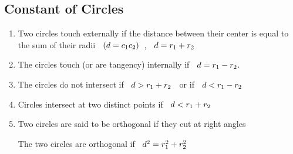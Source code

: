 \documentclass[11pt,a4paper]{article}
\begin{document}
\subsection{Constant of Circles}
\begin{enumerate}
\item Two circles touch externally if the distance between their center is equal to the sum of their radii $\hspace{0.2cm}(d = c_1c_2)\hspace{0.2cm}$, $\hspace{0.2cm} d = r_1 + r_2$

\item The circles touch (or are tangency) internally if $\hspace{0.2cm} d = r_1 - r_2$.

\item The circles do not intersect if $\hspace{0.2cm} d> r_1 + r_2\hspace{0.2cm}$ or  if $\hspace{0.2cm} d< r_1 - r_2$

\item Circles intersect at two distinct points if $\hspace{0.2cm} d < r_1 + r_2$

\item Two circles are said to be orthogonal if they cut at right angles\\

\begin{figure}[H]
\centering
{}
\end{figure}















The two circles are orthogonal if $\hspace{0.2cm}d^2 = r_1^2 + r_2^2$\\\
\end{enumerate}
\end{document}
